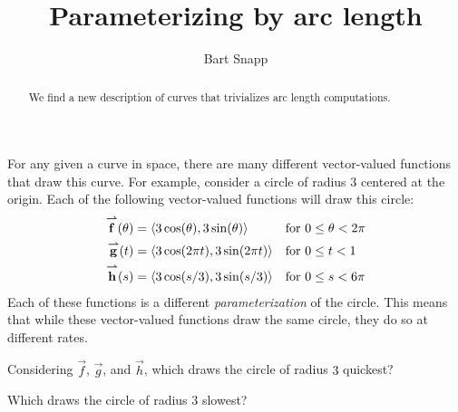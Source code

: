 \documentclass{ximera}
\title[Dig-In:]{Parameterizing by arc length}
\author{Bart Snapp}
\begin{document}
\begin{abstract}
  We find a new description of curves that trivializes arc length
  computations.
\end{abstract}
\maketitle

For any given a curve in space, there are many different vector-valued
functions that draw this curve. For example, consider a circle of
radius $3$ centered at the origin. Each of the following vector-valued
functions will draw this circle:
\begin{align*}
  {\overset{\boldsymbol{\rightharpoonup}}{\mathbf{f}}}(\theta) &=\left\langle 3\cos(\theta),3\sin(\theta)\right\rangle &  &\text{for $0\le \theta<  2\pi$}  \\
  {\overset{\boldsymbol{\rightharpoonup}}{\mathbf{g}}}(t) &= \left\langle 3\cos(2\pi t),3\sin(2\pi t)\right\rangle & &\text{for $0\le t< 1$}  \\
  {\overset{\boldsymbol{\rightharpoonup}}{\mathbf{h}}}(s) &= \left\langle 3\cos(s/3),3\sin(s/3)\right\rangle & &\text{for $0\le s<  6\pi$}
\end{align*}
Each of these functions is a different \textit{parameterization} of
the circle. This means that while these vector-valued functions draw
the same circle, they do so at different rates.

\begin{question}
  Considering $\vec{f}$, $\vec{g}$, and $\vec{h}$, which draws the
  circle of radius $3$ quickest?
  \begin{prompt}
    \begin{multipleChoice}
    \end{multipleChoice}
  \end{prompt}
  \begin{question}
    Which draws the circle of radius $3$ slowest?
    \begin{prompt}
      \begin{multipleChoice}
      \end{multipleChoice}
    \end{prompt}
  \end{question}
\end{question}
\end{document}
